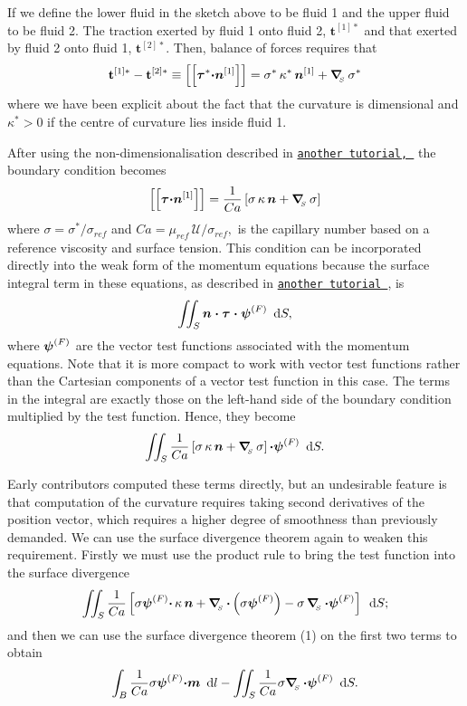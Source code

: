 If we define the lower fluid in the sketch above to be fluid 1 and the upper fluid to be fluid 2. The traction exerted by fluid 1 onto fluid 2, $ \mathbf{t}^{[1]*} $ and that exerted by fluid 2 onto fluid 1, $ \mathbf{t}^{[2]*} $. Then, balance of forces requires that \[ \mathbf{t}^{[1]*} - \mathbf{t}^{[2]*} \equiv \left[\left[ \mbox{\boldmath$\tau$}^{*} \mbox{\boldmath$\cdot n$}^{[1]} \right]\right] = \sigma^{*} \, \kappa^{*} \, \mbox{\boldmath$n$}^{[1]} + \mbox{\boldmath$\nabla$}_{\!\!_{S}}\, \sigma^{*} \] where we have been explicit about the fact that the curvature is dimensional and $ \kappa^{*} > 0 $ if the centre of curvature lies inside fluid 1.

After using the non-\/dimensionalisation described in \href{../../single_layer_free_surface/html/index.html}{\tt another tutorial, } the boundary condition becomes \[\left[\left[ \mbox{\boldmath$\tau$} \mbox{\boldmath$\cdot n$}^{[1]} \right]\right] = \frac{1}{Ca} \left[\sigma \, \kappa \, \mbox{\boldmath$n$} + \mbox{\boldmath$\nabla$}_{\!\!_{S}}\, \sigma \right] \] where $ \sigma = \sigma^{*} / \sigma_{ref} $ and $ Ca = \mu_{ref}\, \mathcal{U} / \sigma_{ref},$ is the capillary number based on a reference viscosity and surface tension. This condition can be incorporated directly into the weak form of the momentum equations because the surface integral term in these equations, as described in \href{../../rayleigh_traction_channel/html/index.html#traction_theory}{\tt another tutorial }, is \[ \int\!\!\!\int_{S} \mbox{\boldmath$n\cdot \tau\cdot \psi$}^{(F)}\,\mbox{ d}S, \] where $ \mbox{\boldmath$\psi$}^{(F)}$ are the vector test functions associated with the momentum equations. Note that it is more compact to work with vector test functions rather than the Cartesian components of a vector test function in this case. The terms in the integral are exactly those on the left-\/hand side of the boundary condition multiplied by the test function. Hence, they become \[ \int\!\!\!\int_{S} \frac{1}{Ca} \left[\sigma \, \kappa \, \mbox{\boldmath$n$} + \mbox{\boldmath$\nabla$}_{\!\!_{S}}\, \sigma \right]\mbox{\boldmath$\cdot\psi$}^{(F)}\, \mbox{ d}S. \]

Early contributors computed these terms directly, but an undesirable feature is that computation of the curvature requires taking second derivatives of the position vector, which requires a higher degree of smoothness than previously demanded. We can use the surface divergence theorem again to weaken this requirement. Firstly we must use the product rule to bring the test function into the surface divergence \[ \int\!\!\!\int_{S} \frac{1}{Ca} \left[\sigma \mbox{\boldmath$\psi$}^{(F)} \mbox{\boldmath$\cdot$}\, \kappa \, \mbox{\boldmath$n$} + \mbox{\boldmath$\nabla$}_{\!\!_{S}}\, \mbox{\boldmath$\cdot$}\left(\sigma \mbox{\boldmath$\psi$}^{(F)} \right) - \sigma\, \mbox{\boldmath$\nabla$}_{\!\!_{S}}\,\mbox{\boldmath$\cdot\psi$}^{(F)} \right]\, \mbox{ d}S; \] and then we can use the surface divergence theorem (1) on the first two terms to obtain \[ \int_{B} \frac{1}{Ca} \sigma \mbox{\boldmath$\psi$}^{(F)} \mbox{\boldmath$\cdot m$}\,\mbox{ d}l - \int\!\!\!\int_{S} \frac{1}{Ca} \sigma \mbox{\boldmath$\nabla$}_{\!\!_{S}}\, \mbox{\boldmath$\cdot\psi$}^{(F)} \, \mbox{ d}S. \]

